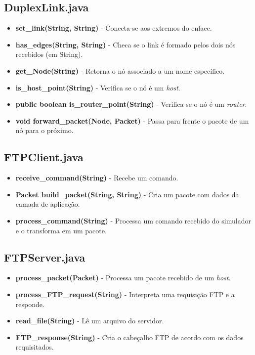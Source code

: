\documentclass[11pt]{article}
\begin{document}
\subsection{DuplexLink.java}

\begin{itemize}
	\item \textbf{set_link(String, String)} - Conecta-se aos extremos do enlace.
	\item \textbf{has_edges(String, String)} - Checa se o link é formado pelos dois nós recebidos (em String).
	\item \textbf{get_Node(String)} - Retorna o nó associado a um nome específico.
	\item \textbf{is_host_point(String)} - Verifica se o nó é um \textit{host}.
	\item \textbf{public boolean is_router_point(String)} - Verifica se o nó é um \textit{router}.
	\item \textbf{void forward_packet(Node, Packet)} - Passa para frente o pacote de um nó para o próximo.
\end{itemize}

\subsection{FTPClient.java}

\begin{itemize}
	\item \textbf{receive_command(String)} - Recebe um comando.
	\item \textbf{Packet build_packet(String, String)} - Cria um pacote com dados da camada de aplicação.
	\item \textbf{process_command(String)} - Processa um comando recebido do simulador e o transforma em um pacote.
\end{itemize}

\subsection{FTPServer.java}

\begin{itemize}
	\item \textbf{process_packet(Packet)} - Processa um pacote recebido de um \textit{host}.
	\item \textbf{process_FTP_request(String)} - Interpreta uma requisição FTP e a responde.
	\item \textbf{read_file(String)} - Lê um arquivo do servidor.
	\item \textbf{FTP_response(String)} - Cria o cabeçalho FTP de acordo com os dados requisitados.
\end{itemize}
\end{document}
